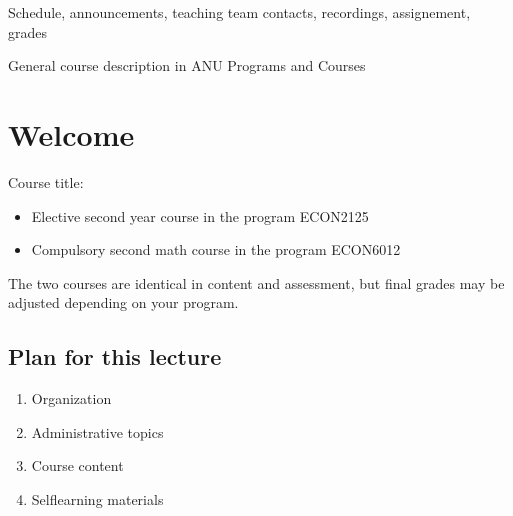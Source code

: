 \documentclass[letterpaper,10pt,english]{jupyterBook}
\begin{document}
\begin{DUlineblock}{0em}
\item[] 
\end{DUlineblock}

\sphinxAtStartPar
{}
Schedule, announcements, teaching team contacts, recordings, assignement, grades

\sphinxAtStartPar
{}
General course description in ANU Programs and Courses



\sphinxstepscope


\chapter{Welcome}
\label{\detokenize{01.introduction:welcome}}\label{\detokenize{01.introduction::doc}}
\sphinxAtStartPar
Course title: 
\begin{itemize}
\item {} 
\sphinxAtStartPar
Elective second year course in the  program ECON2125

\item {} 
\sphinxAtStartPar
Compulsory second math course in the  program ECON6012

\end{itemize}

\sphinxAtStartPar
The two courses are identical in content and assessment, but final grades may be adjusted depending on your program.


\section{Plan for this lecture}
\label{\detokenize{01.introduction:plan-for-this-lecture}}\begin{enumerate}
%
\item {} 
\sphinxAtStartPar
Organization

\item {} 
\sphinxAtStartPar
Administrative topics

\item {} 
\sphinxAtStartPar
Course content

\item {} 
\sphinxAtStartPar
Self\sphinxhyphen{}learning materials

\end{enumerate}
\end{document}
